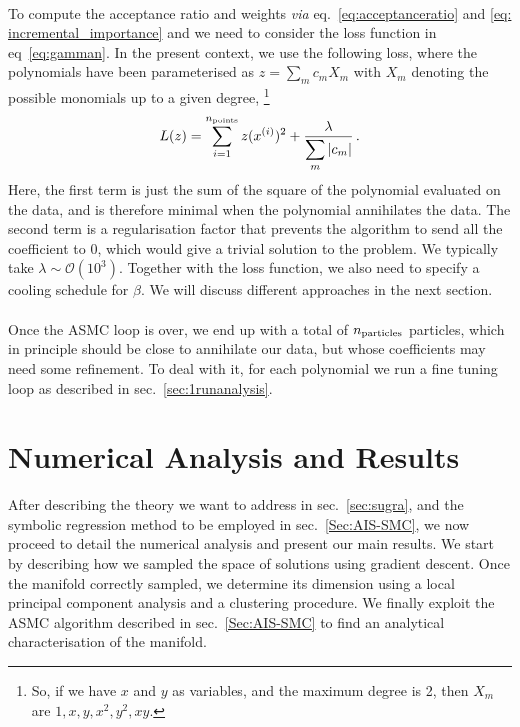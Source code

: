 \documentclass[11pt,a4paper]{article}
\begin{document}
	\paragraph{}
	To compute the acceptance ratio and weights \textit{via} eq.~\eqref{eq:acceptanceratio} and \eqref{eq: incremental_importance} and we need to consider the loss function in eq~\eqref{eq:gamman}.
	In the present context, we use the following loss, where the polynomials have been parameterised as $z = \sum_m c_m X_m$ with $X_m$ denoting the possible monomials up to a given degree,%
	\footnote{So, if we have $x$ and $y$ as variables, and the maximum degree is 2, then $X_m$ are $1, x, y, x^2, y^2, x y$.}
	\begin{equation} \label{eq:lossreg}
		L(z) = \sum_{i=1}^{n_{\rm points}} z(x^{(i)})^2 + \frac{\lambda}{\displaystyle \sum_m |c_m|}\,.
	\end{equation}
	Here, the first term is just the sum of the square of the polynomial evaluated on the data, and is therefore minimal when the polynomial annihilates the data. 
	The second term is a regularisation factor that prevents the algorithm to send all the coefficient to 0, which would give a trivial solution to the problem. 
	We typically take $\lambda \sim \mathcal{O}(10^3)$. 
	Together with the loss function, we also need to specify a cooling schedule for $\beta$. We will discuss different approaches in the next section.
	
	\paragraph{}
	Once the ASMC loop is over, we end up with a total of $n_{\rm particles}$ particles, which in principle should be close to annihilate our data, but whose coefficients may need some refinement. To deal with it, for each polynomial we run a fine tuning loop as described in sec.~\ref{sec:1runanalysis}.
	
\section{Numerical Analysis and Results} \label{sec:results}
After describing the theory we want to address in sec.~\ref{sec:sugra}, and the symbolic regression method to be employed in sec.~\ref{Sec:AIS-SMC}, we now proceed to detail the numerical analysis and present our main results. 
We start by describing how we sampled the space of solutions using gradient descent. Once the manifold correctly sampled, we determine its dimension using a local principal component analysis and a clustering procedure. We finally exploit the ASMC algorithm described in sec.~\ref{Sec:AIS-SMC} to find an analytical characterisation of the manifold.
\end{document}
